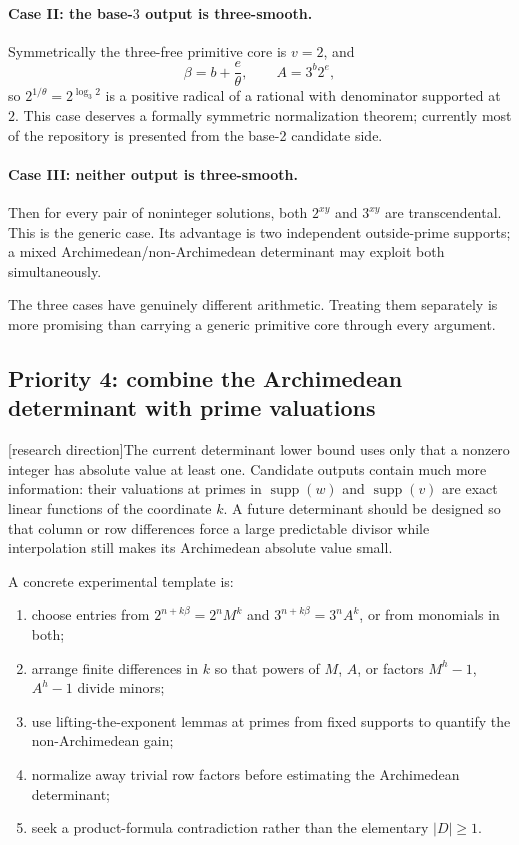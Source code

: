 \documentclass[11pt,oneside]{article}
\theoremstyle{definition}
\newcommand{\supp}{\operatorname{supp}}
\newcommand{\tagProposal}{\textcolor{BrickRed}{\textsf{[research direction]}}}
\begin{document}
\paragraph{Case II: the base-$3$ output is three-smooth.}
Symmetrically the three-free primitive core is \(v=2\), and
\[
  \beta=b+\frac e\theta,
  \qquad
  A=3^b2^e,
\]
so \(2^{1/\theta}=2^{\log_3 2}\) is a positive radical of a rational with denominator
supported at \(2\).  This case deserves a formally symmetric normalization theorem;
currently most of the repository is presented from the base-2 candidate side.

\paragraph{Case III: neither output is three-smooth.}
Then for every pair of noninteger solutions, both \(2^{xy}\) and \(3^{xy}\) are
transcendental.  This is the generic case.  Its advantage is two independent outside-prime
supports; a mixed Archimedean/non-Archimedean determinant may exploit both simultaneously.

The three cases have genuinely different arithmetic.  Treating them separately is more
promising than carrying a generic primitive core through every argument.

\subsection{Priority 4: combine the Archimedean determinant with prime valuations}

\tagProposal The current determinant lower bound uses only that a nonzero integer has
absolute value at least one.  Candidate outputs contain much more information: their
valuations at primes in \(\supp(w)\) and \(\supp(v)\) are exact linear functions of the
coordinate \(k\).  A future determinant should be designed so that column or row
differences force a large predictable divisor while interpolation still makes its
Archimedean absolute value small.

A concrete experimental template is:
\begin{enumerate}
\item choose entries from \(2^{n+k\beta}=2^nM^k\) and
\(3^{n+k\beta}=3^nA^k\), or from monomials in both;
\item arrange finite differences in \(k\) so that powers of \(M\), \(A\), or factors
\(M^h-1\), \(A^h-1\) divide minors;
\item use lifting-the-exponent lemmas at primes from fixed supports to quantify the
non-Archimedean gain;
\item normalize away trivial row factors before estimating the Archimedean determinant;
\item seek a product-formula contradiction rather than the elementary \(|D|\ge1\).
\end{enumerate}
\end{document}
